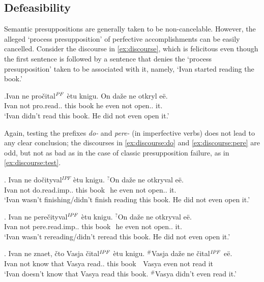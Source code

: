 \subsection{Defeasibility}
Semantic presuppositions are generally taken to be non-cancelable. However, the alleged `process presupposition' of perfective accomplishments can be easily cancelled. Consider the discourse in \ref{ex:discourse}, which is felicitous even though the first sentence is followed by a sentence that denies the `process presupposition' taken to be associated with it, namely, `Ivan started reading the book.'

\exg.\label{ex:discourse}Ivan ne pro\v{c}ital$^{\mathit{PF}}$ \`{e}tu knigu. On da\v{z}e ne otkryl e\"{e}.\\
Ivan not pro.read.. this book he even not open.. it.\\
\vspace{0.5em}
 `Ivan didn't read this book. He did not even open it.'

Again, testing the prefixes \textit{do-} and \textit{pere-} (in imperfective verbs) does not lead to any clear conclusion; the discourses in \ref{ex:discourse:do} and \ref{ex:discourse:pere} are odd, but not as bad as in the case of classic presupposition failure, as in \ref{ex:discourse:test}.

\exg. \label{ex:discourse:do}Ivan ne do\v{c}ityval$^{IPF}$ \`{e}tu knigu. $^?$On da\v{z}e ne otkryval e\"{e}.\\
Ivan not do.read.imp.. this book \textcolor{white}{$^?$}he even not open.. it.\\
\vspace{0.5em}
 `Ivan wasn't finishing/didn't finish reading this book. He did not even open it.'

\exg. \label{ex:discourse:pere}Ivan ne pere\v{c}ityval$^{\mathit{IPF}}$ \`{e}tu knigu. $^?$On da\v{z}e ne otkryval e\"{e}.\\
Ivan not pere.read.imp.. this book \textcolor{white}{$^?$}he even not open.. it.\\
\vspace{0.5em}
 `Ivan wasn't rereading/didn't reread this book. He did not even open it.'

\exg. \label{ex:discourse:test}Ivan ne znaet, \v{c}to Vasja \v{c}ital$^{\mathit{IPF}}$ \`{e}tu knigu. $^\#$Vasja da\v{z}e ne \v{c}ital$^{\mathit{IPF}}$ e\"{e}.\\
Ivan not know that Vasya read.. this book \textcolor{white}{$^\#$}Vasya even not read it\\
\vspace{0.5em}
 `Ivan doesn't know that Vasya read this book. $^\#$Vasya didn't even read it.'


